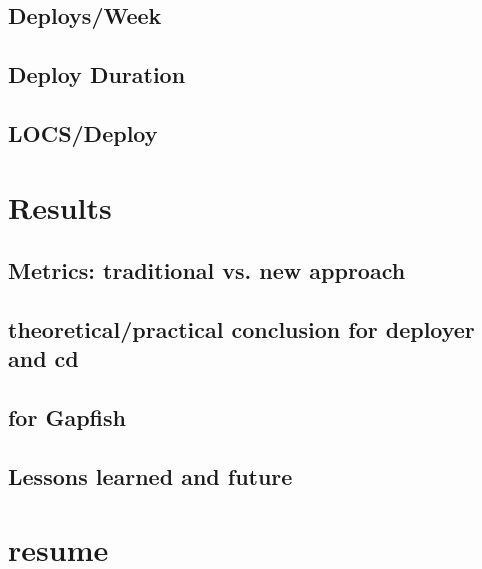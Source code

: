 \section{Deploys/Week}
\section{Deploy Duration}
\section{LOCS/Deploy}

\chapter{Results}
\section{Metrics: traditional vs. new approach}
\section{theoretical/practical conclusion for deployer and cd}
\section{for Gapfish}
\section{Lessons learned and future}

\chapter{resume}
